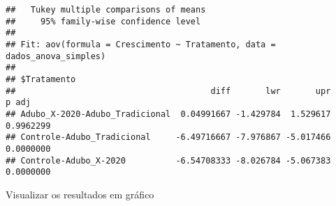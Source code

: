 \documentclass[
]{book}
\newenvironment{Shaded}{\begin{snugshade}}{\end{snugshade}}
\newcommand{\CommentTok}[1]{\textcolor[rgb]{0.56,0.35,0.01}{\textit{#1}}}
\newcommand{\DataTypeTok}[1]{\textcolor[rgb]{0.13,0.29,0.53}{#1}}
\newcommand{\KeywordTok}[1]{\textcolor[rgb]{0.13,0.29,0.53}{\textbf{#1}}}
\newcommand{\NormalTok}[1]{#1}
\newcommand{\OperatorTok}[1]{\textcolor[rgb]{0.81,0.36,0.00}{\textbf{#1}}}
\newcommand{\StringTok}[1]{\textcolor[rgb]{0.31,0.60,0.02}{#1}}
\begin{document}
\begin{verbatim}
##   Tukey multiple comparisons of means
##     95% family-wise confidence level
## 
## Fit: aov(formula = Crescimento ~ Tratamento, data = dados_anova_simples)
## 
## $Tratamento
##                                       diff       lwr       upr     p adj
## Adubo_X-2020-Adubo_Tradicional  0.04991667 -1.429784  1.529617 0.9962299
## Controle-Adubo_Tradicional     -6.49716667 -7.976867 -5.017466 0.0000000
## Controle-Adubo_X-2020          -6.54708333 -8.026784 -5.067383 0.0000000
\end{verbatim}

Visualizar os resultados em gráfico

\begin{Shaded}
\end{Shaded}
\end{document}
